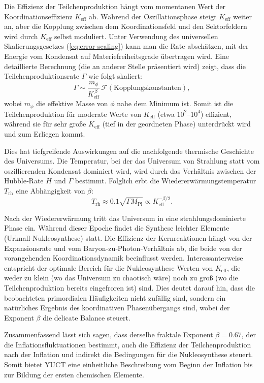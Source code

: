 \documentclass[12pt]{article}
\theoremstyle{remark}
\newcommand{\Keff}{K_{\mathrm{eff}}}
\begin{document}
	Die Effizienz der Teilchenproduktion hängt vom momentanen Wert der Koordinationseffizienz $\Keff$ ab. Während der Oszillationsphase steigt $\Keff$ weiter an, aber die Kopplung zwischen dem Koordinationsfeld und den Sektorfeldern wird durch $\Keff$ selbst moduliert. Unter Verwendung des universellen Skalierungsgesetzes (\ref{eq:error-scaling}) kann man die Rate abschätzen, mit der Energie vom Kondensat auf Materiefreiheitsgrade übertragen wird. Eine detaillierte Berechnung (die an anderer Stelle präsentiert wird) zeigt, dass die Teilchenproduktionsrate $\Gamma$ wie folgt skaliert:
	\begin{equation}
		\Gamma \sim \frac{m_\phi}{\Keff^{\,\beta}} \, \mathcal{F}(\text{Kopplungskonstanten}),
		\label{eq:gamma}
	\end{equation}
	wobei $m_\phi$ die effektive Masse von $\phi$ nahe dem Minimum ist. Somit ist die Teilchenproduktion für moderate Werte von $\Keff$ (etwa $10^2$–$10^4$) effizient, während sie für sehr große $\Keff$ (tief in der geordneten Phase) unterdrückt wird und zum Erliegen kommt.
	
	Dies hat tiefgreifende Auswirkungen auf die nachfolgende thermische Geschichte des Universums. Die Temperatur, bei der das Universum von Strahlung statt vom oszillierenden Kondensat dominiert wird, wird durch das Verhältnis zwischen der Hubble‑Rate $H$ und $\Gamma$ bestimmt. Folglich erbt die Wiedererwärmungstemperatur $T_{\mathrm{rh}}$ eine Abhängigkeit von $\beta$:
	\begin{equation}
		T_{\mathrm{rh}} \approx 0.1 \sqrt{\Gamma M_{\mathrm{Pl}}} \propto \Keff^{-\beta/2}.
		\label{eq:trh}
	\end{equation}
	
	Nach der Wiedererwärmung tritt das Universum in eine strahlungsdominierte Phase ein. Während dieser Epoche findet die Synthese leichter Elemente (Urknall‑Nukleosynthese) statt. Die Effizienz der Kernreaktionen hängt von der Expansionsrate und vom Baryon‑zu‑Photon‑Verhältnis ab, die beide von der vorangehenden Koordinationsdynamik beeinflusst werden. Interessanterweise entspricht der optimale Bereich für die Nukleosynthese Werten von $\Keff$, die weder zu klein (wo das Universum zu chaotisch wäre) noch zu groß (wo die Teilchenproduktion bereits eingefroren ist) sind. Dies deutet darauf hin, dass die beobachteten primordialen Häufigkeiten nicht zufällig sind, sondern ein natürliches Ergebnis des koordinativen Phasenübergangs sind, wobei der Exponent $\beta$ die delicate Balance steuert.
	
	Zusammenfassend lässt sich sagen, dass derselbe fraktale Exponent $\beta = 0.67$, der die Inflationsfluktuationen bestimmt, auch die Effizienz der Teilchenproduktion nach der Inflation und indirekt die Bedingungen für die Nukleosynthese steuert. Somit bietet YUCT eine einheitliche Beschreibung vom Beginn der Inflation bis zur Bildung der ersten chemischen Elemente.
	
\end{document}
